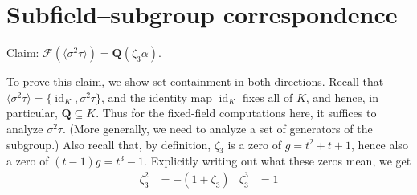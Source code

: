 \documentclass[oneside, english, 11pt]{article}
\newcommand{\fontField}[1]{\mathbf{#1}}
\newcommand{\fixedField}{\mathcal{F}}
\newcommand{\id}{\identityMap}
\DeclareMathOperator{\identityMap}{id}
\newcommand{\Q}{\rationals}
\newcommand{\rationals}{\fontField{Q}}
\begin{document}
%
%



\section{Subfield--subgroup correspondence}

Claim: $\fixedField(\langle{}\sigma^{2} \tau\rangle{}) = \Q(\zeta_{3} \alpha)$.

To prove this claim, we show set containment in both directions. Recall that $\langle{}\sigma^{2} \tau\rangle{} = \{\id_{K}, \sigma^{2} \tau\}$, and the identity map $\id_{K}$ fixes all of $K$, and hence, in particular, $\Q \subseteq K$. Thus for the fixed-field computations here, it suffices to analyze $\sigma^{2} \tau$. (More generally, we need to analyze a set of generators of the subgroup.) Also recall that, by definition, $\zeta_{3}$ is a zero of $g = t^{2} + t + 1$, hence also a zero of $(t - 1) g = t^{3} - 1$. Explicitly writing out what these zeros mean, we get
\begin{align*}
\zeta_{3}^{2}
&=
-(1 + \zeta_{3})
&
\zeta_{3}^{3}
&=
1
\end{align*}
\end{document}
